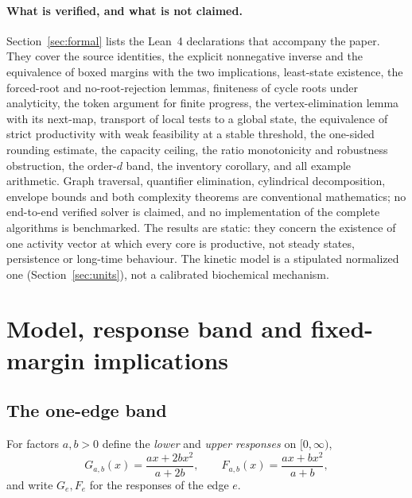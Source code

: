 \documentclass[11pt,a4paper]{article}
\theoremstyle{plain}
\theoremstyle{definition}
\theoremstyle{remark}
\begin{document}
\paragraph{What is verified, and what is not claimed.} Section~\ref{sec:formal} lists the Lean~4 \citep{demoura2021,mathlib2020} declarations that accompany the paper. They cover the source identities, the explicit nonnegative inverse and the equivalence of boxed margins with the two implications, least-state existence, the forced-root and no-root-rejection lemmas, finiteness of cycle roots under analyticity, the token argument for finite progress, the vertex-elimination lemma with its next-map, transport of local tests to a global state, the equivalence of strict productivity with weak feasibility at a stable threshold, the one-sided rounding estimate, the capacity ceiling, the ratio monotonicity and robustness obstruction, the order-$d$ band, the inventory corollary, and all example arithmetic. Graph traversal, quantifier elimination, cylindrical decomposition, envelope bounds and both complexity theorems are conventional mathematics; no end-to-end verified solver is claimed, and no implementation of the complete algorithms is benchmarked. The results are static: they concern the existence of one activity vector at which every core is productive, not steady states, persistence or long-time behaviour. The kinetic model is a stipulated normalized one (Section~\ref{sec:units}), not a calibrated biochemical mechanism.

\section{Model, response band and fixed-margin implications}\label{sec:model}

\subsection{The one-edge band}
For factors $a,b>0$ define the \emph{lower} and \emph{upper responses} on $[0,\infty)$,
\begin{equation}\label{eq:responses}
  G_{a,b}(x)=\frac{ax+2bx^2}{a+2b},\qquad F_{a,b}(x)=\frac{ax+bx^2}{a+b},
\end{equation}
and write $G_e,F_e$ for the responses of the edge $e$.
\end{document}
